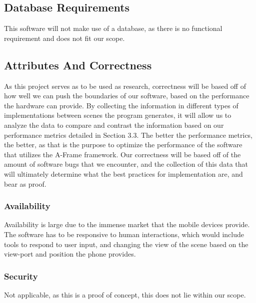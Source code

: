 \documentclass[letterpaper,10pt,titlepage,draftclsnofoot,onecolumn,compsoc,utf8,latin1]{IEEEtran}
\begin{document}
\begin{singlespace}
\subsection{Database Requirements}
\begin{singlespace}
\noindent
This software will not make use of a database, as there is no functional requirement and does not fit our scope.
\end{singlespace}

\subsection{Attributes And Correctness}
\begin{singlespace}
\noindent
As this project serves as to be used as research, correctness will be based off of how well we can push the boundaries of our software, based on the performance the hardware can provide. By collecting the information in different types of implementations between scenes the program generates, it will allow us to analyze the data to compare and contrast the information based on our performance metrics detailed in Section 3.3. The better the performance metrics, the better, as that is the purpose to optimize the performance of the software that utilizes the A-Frame framework. Our correctness will be based off of the amount of software bugs that we encounter, and the collection of this data that will ultimately determine what the best practices for implementation are, and bear as proof.
\end{singlespace}

\subsubsection{Availability}
\begin{singlespace}
\noindent
Availability is large due to the immense market that the mobile devices provide. The software has to be responsive to human interactions, which would include tools to respond to user input, and changing the view of the scene based on the view-port and position the phone provides.
\end{singlespace}

\subsubsection{Security}
\begin{singlespace}
\noindent
Not applicable, as this is a proof of concept, this does not lie within our scope.
\end{singlespace}


\end{singlespace}
\end{document}
